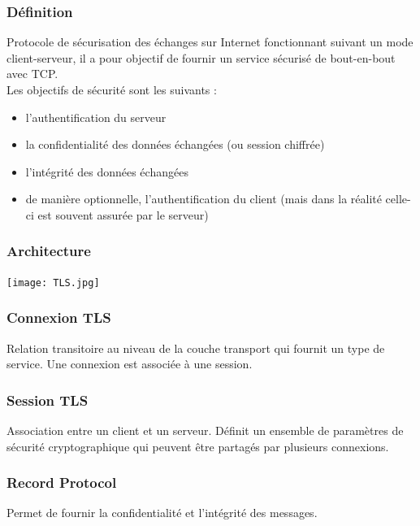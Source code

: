 \documentclass{report}
\begin{document}
\subsubsection{Définition}

 Protocole de sécurisation des échanges sur Internet fonctionnant suivant un mode client-serveur, il a pour objectif de fournir un service sécurisé de bout-en-bout avec TCP.\\

 Les objectifs de sécurité sont les suivants :
 \begin{itemize}
    \item l'authentification du serveur
    \item la confidentialité des données échangées (ou session chiffrée)
    \item l'intégrité des données échangées
    \item de manière optionnelle, l'authentification du client (mais dans la réalité celle-ci est souvent assurée par le serveur)
 \end{itemize}

 \subsubsection{Architecture}

 \texttt{[image: TLS.jpg]}

 \subsubsection{Connexion TLS}

Relation transitoire au niveau de la couche transport qui fournit un
type de service. Une connexion est associée à une session.

 \subsubsection{Session TLS}

 Association entre un client et un serveur. Définit un ensemble de paramètres de sécurité cryptographique qui peuvent être partagés par plusieurs connexions.

 \subsubsection{Record Protocol}

 Permet de fournir la confidentialité et l'intégrité des messages.
\end{document}
